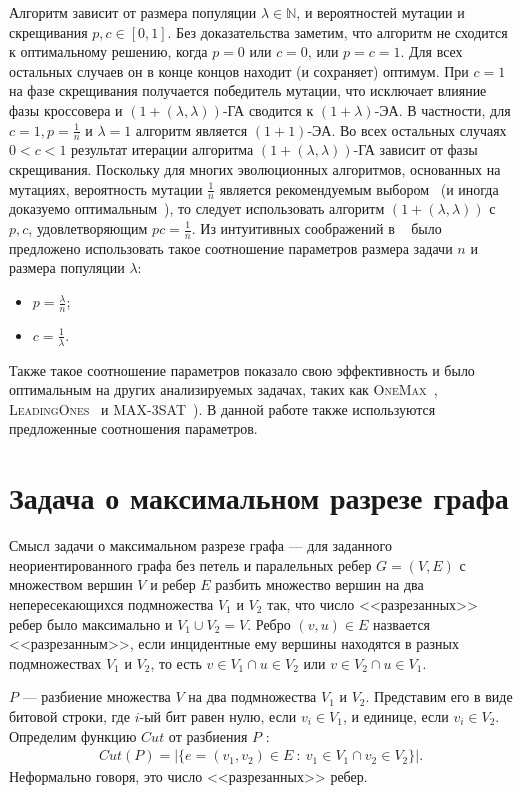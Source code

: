 \documentclass[times]{itmo-student-thesis}
\newcommand{\alglambda}{${(1 + (\lambda , \lambda))}$\xspace}
\newcommand{\alglambdaf}{${(1 + (\lambda , \lambda))}$-ГА\xspace}
\newcommand{\oea}{\mbox{$(1 + 1)$-ЭА}\xspace}
\newcommand{\oplea}{\mbox{$(1+\lambda)$-ЭА}\xspace}
\newcommand{\onemax}{\textsc{OneMax}\xspace}
\newcommand{\leadingones}{\textsc{LeadingOnes}\xspace}
\newcommand{\N}{{\mathbb N}}
\begin{document}
Алгоритм зависит от размера популяции $\lambda \in \N$, и вероятностей мутации и скрещивания $p, c \in [0, 1]$.
Без доказательства заметим, что алгоритм не сходится к оптимальному решению, когда $p = 0$ или $c = 0$, или $p = c = 1$.
Для всех остальных случаев он в конце концов находит (и сохраняет) оптимум.
При $c = 1$ на фазе скрещивания получается победитель мутации, что исключает влияние фазы кроссовера и \alglambdaf сводится к \oplea.
В частности, для $c = 1, p = \frac{1}{n}$ и $\lambda = 1$ алгоритм является \oea.
Во всех остальных случаях $0 < c < 1$ результат итерации алгоритма \alglambdaf зависит от фазы скрещивания.
Поскольку для многих эволюционных алгоритмов, основанных на мутациях, вероятность мутации $\frac{1}{n}$ является рекомендуемым выбором~\cite{ссылка} (и иногда доказуемо  оптимальным~\cite{ссылка}), то следует использовать алгоритм \alglambda с $p, c$, удовлетворяющим $pc = \frac{1}{n}$.
Из интуитивных соображений в ~\cite{ссылка} было предложено использовать такое соотношение параметров размера задачи $n$ и размера популяции $\lambda$:
\begin{itemize}
 \item $p = \frac{\lambda}{n}$;
 \item $c = \frac{1}{\lambda}$.
 \end{itemize}
Также такое соотношение параметров показало свою эффективность и было оптимальным на других анализируемых задачах, таких как \onemax~\cite{ссылка}, \leadingones~\cite{ссылка} и MAX-3SAT~\cite{ссылка}). В данной работе также используются предложенные соотношения параметров.


\section{Задача о максимальном разрезе графа}

Смысл задачи о максимальном разрезе графа --- для заданного неориентированного графа без петель и паралельных ребер $G = (V, E)$ с множеством вершин $V$ и ребер $E$ разбить множество вершин на два непересекающихся подмножества $V_1$ и $V_2$ так, что число <<разрезанных>> ребер было максимально и $V_1 \cup V_2 = V$.
 Ребро $(v, u) \in E$ назвается <<разрезанным>>, если инцидентные ему вершины находятся в разных подмножествах $V_1$ и $V_2$, то есть $v \in V_1 \cap u \in V_2$ или $v \in V_2 \cap u \in V_1$.

$P$ --- разбиение множества $V$ на два подмножества $V_1$ и $V_2$.
Представим его в виде битовой строки, где $i$-ый бит равен нулю, если $v_i \in V_1$, и единице, если $v_i \in V_2$.
Определим функцию  $Cut$ от разбиения $P$ :
\begin{align*}
   Cut(P) = |\{e = (v_1, v_2) \in E ~:~ v_1 \in V_1 \cap v_2 \in V_2\}|.
\end{align*}
Неформально говоря, это число <<разрезанных>> ребер.
\end{document}
